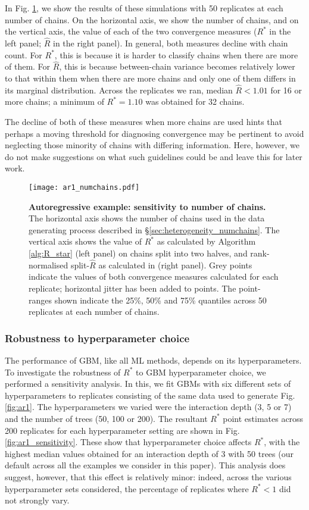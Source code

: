 \documentclass{article}
\begin{document}
In Fig. \ref{fig:ar1_numchains}, we show the results of these simulations with 50 replicates at each number of chains. On the horizontal axis, we show the number of chains, and on the vertical axis, the value of each of the two convergence measures ($R^*$ in the left panel; $\widehat{R}$ in the right panel). In general, both measures decline with chain count. For $R^*$, this is because it is harder to classify chains when there are more of them. For $\widehat{R}$, this is because between-chain variance becomes relatively lower to that within them when there are more chains and only one of them differs in its marginal distribution. Across the replicates we ran, median $\widehat{R}<1.01$ for 16 or more chains; a minimum of $R^*=1.10$ was obtained for 32 chains.

The decline of both of these measures when more chains are used hints that perhaps a moving threshold for diagnosing convergence may be pertinent to avoid neglecting those minority of chains with differing information. Here, however, we do not make suggestions on what such guidelines could be and leave this for later work.

\begin{figure}[!htb]
	\centerline{\texttt{[image: ar1\_numchains.pdf]}}
	\caption{\textbf{Autoregressive example: sensitivity to number of chains.} The horizontal axis shows the number of chains used in the data generating process described in \S\ref{sec:heterogeneity_numchains}. The vertical axis shows the value of $R^*$ as calculated by Algorithm \ref{alg:R_star} (left panel) on chains split into two halves, and rank-normalised split-$\widehat{R}$ as calculated in \cite{vehtari2019rank} (right panel). Grey points indicate the values of both convergence measures calculated for each replicate; horizontal jitter has been added to points. The point-ranges shown indicate the 25\%, 50\% and 75\% quantiles across 50 replicates at each number of chains.}
	\label{fig:ar1_numchains}
\end{figure}

\subsubsection{Robustness to hyperparameter choice}\label{sec:heterogeneity_robustness}
The performance of GBM, like all ML methods, depends on its hyperparameters. To investigate the robustness of $R^*$ to GBM hyperparameter choice, we performed a sensitivity analysis. In this, we fit GBMs with six different sets of hyperparameters to replicates consisting of the same data used to generate Fig. \ref{fig:ar1}. The hyperparameters we varied were the interaction depth (3, 5 or 7) and the number of trees (50, 100 or 200). The resultant $R^*$ point estimates across 200 replicates for each hyperparameter setting are shown in Fig. \ref{fig:ar1_sensitivity}. These show that hyperparameter choice affects $R^*$, with the highest median values obtained for an interaction depth of 3 with 50 trees (our default across all the examples we consider in this paper). This analysis does suggest, however, that this effect is relatively minor: indeed, across the various hyperparameter sets considered, the percentage of replicates where $R^*<1$ did not strongly vary.
\end{document}
